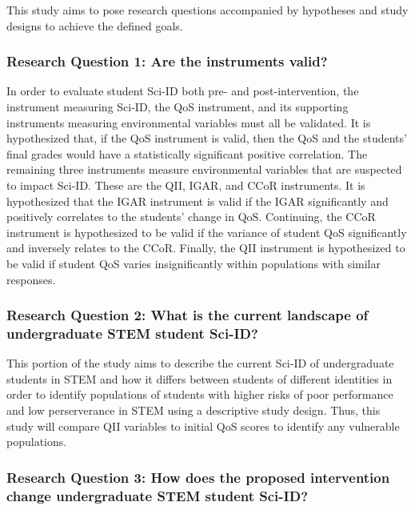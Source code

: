 \documentclass[10pt, twocolumn]{article}
\begin{document}
        This study aims to pose research questions accompanied by hypotheses and study designs to achieve the defined goals.      

        \subsubsection{Research Question 1: Are the instruments valid?}

            In order to evaluate student Sci-ID both pre- and post-intervention, the instrument measuring Sci-ID, the QoS instrument, and its supporting instruments measuring environmental variables must all be validated. It is hypothesized that, if the QoS instrument is valid, then the QoS and the students' final grades would have a statistically significant positive correlation. The remaining three instruments measure environmental variables that are suspected to impact Sci-ID. These are the QII, IGAR, and CCoR instruments. It is hypothesized that the IGAR instrument is valid if the IGAR significantly and positively correlates to the students' change in QoS. Continuing, the CCoR instrument is hypothesized to be valid if the variance of student QoS significantly and inversely relates to the CCoR. Finally, the QII instrument is hypothesized to be valid if student QoS varies insignificantly within populations with similar responses.

        \subsubsection{Research Question 2: What is the current landscape of undergraduate STEM student Sci-ID?}

            This portion of the study aims to describe the current Sci-ID of undergraduate students in STEM and how it differs between students of different identities in order to identify populations of students with higher risks of poor performance and low perserverance in STEM using a descriptive study design. Thus, this study will compare QII variables to initial QoS scores to identify any vulnerable populations.

        \subsubsection{Research Question 3: How does the proposed intervention change undergraduate STEM student Sci-ID?}
            
\end{document}
